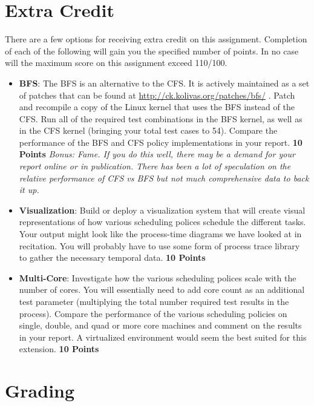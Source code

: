 \documentclass[12pt]{article}
\begin{document}
\section{Extra Credit}

There are a few options for receiving extra credit on this
assignment. Completion of each of the following will gain you the
specified number of points. In no case will the maximum score on
this assignment exceed 110/100.

\begin{itemize}
\item {\bf BFS}: The BFS is an alternative to the
  CFS. It is actively maintained as a set of patches that
  can be found at
  \url{http://ck.kolivas.org/patches/bfs/}
  \cite{Kolivas-BFS,Kolivas-BFSFAQ}. Patch
  and recompile a copy of the Linux kernel that uses the BFS instead
  of the CFS. Run all of the required test combinations in the BFS
  kernel, as well as in the CFS kernel (bringing your total test cases
  to 54). Compare the performance of the BFS and CFS policy
  implementations in your
  report. {\bf 10 Points} \emph{Bonus: Fame. If you do this well, there may
  be a demand for your report online or in publication. There has been
  a lot of speculation on the relative performance of CFS vs BFS but not
  much comprehensive data to back it up.}
\item {\bf Visualization}: Build or deploy a visualization system that
  will create visual representations of how various scheduling polices
  schedule the different tasks. Your output might look like the
  process-time diagrams we have looked at in recitation. You will
  probably have to use some form of process trace library to gather the
  necessary temporal data. {\bf 10 Points}
\item {\bf Multi-Core}: Investigate how the various scheduling polices
  scale with the number of cores. You will essentially need to add core
  count as an additional test parameter (multiplying the total number
  required test
  results in the process). Compare the performance of the various
  scheduling policies on single, double, and quad or more core machines and
  comment on the results in your report. A virtualized environment
  would seem the best suited for this extension. {\bf 10 Points}
\end{itemize}

\section{Grading}
\end{document}

